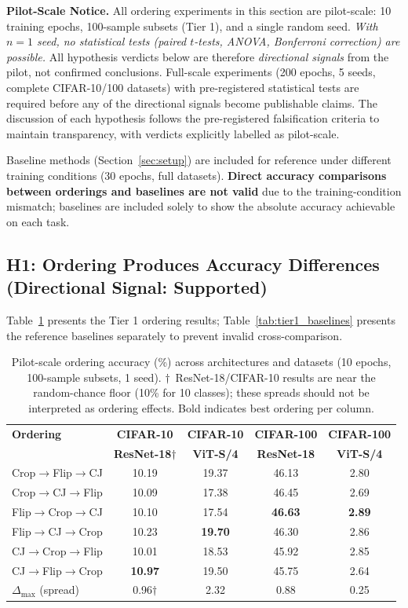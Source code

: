 \documentclass{article}
\begin{document}
\noindent\textbf{Pilot-Scale Notice.} All ordering experiments in this section are pilot-scale: 10 training epochs, 100-sample subsets (Tier 1), and a single random seed. \textit{With $n=1$ seed, no statistical tests (paired $t$-tests, ANOVA, Bonferroni correction) are possible.} All hypothesis verdicts below are therefore \emph{directional signals} from the pilot, not confirmed conclusions. Full-scale experiments (200 epochs, 5 seeds, complete CIFAR-10/100 datasets) with pre-registered statistical tests are required before any of the directional signals become publishable claims. The discussion of each hypothesis follows the pre-registered falsification criteria to maintain transparency, with verdicts explicitly labelled as pilot-scale.

Baseline methods (Section~\ref{sec:setup}) are included for reference under different training conditions (30 epochs, full datasets). \textbf{Direct accuracy comparisons between orderings and baselines are not valid} due to the training-condition mismatch; baselines are included solely to show the absolute accuracy achievable on each task.

\subsection{H1: Ordering Produces Accuracy Differences (Directional Signal: Supported)}

Table~\ref{tab:tier1_orderings} presents the Tier 1 ordering results; Table~\ref{tab:tier1_baselines} presents the reference baselines separately to prevent invalid cross-comparison.

\begin{table}[t]
\centering
\caption{Pilot-scale ordering accuracy (\%) across architectures and datasets (10 epochs, 100-sample subsets, 1 seed). $\dagger$~ResNet-18/CIFAR-10 results are near the random-chance floor (10\% for 10 classes); these spreads should not be interpreted as ordering effects. Bold indicates best ordering per column.}
\label{tab:tier1_orderings}
\small
\begin{tabular}{lcccc}
\toprule
\textbf{Ordering} & \textbf{CIFAR-10} & \textbf{CIFAR-10} & \textbf{CIFAR-100} & \textbf{CIFAR-100} \\
 & \textbf{ResNet-18}$\dagger$ & \textbf{ViT-S/4} & \textbf{ResNet-18} & \textbf{ViT-S/4} \\
\midrule
Crop$\to$Flip$\to$CJ & 10.19 & 19.37 & 46.13 & 2.80 \\
Crop$\to$CJ$\to$Flip & 10.09 & 17.38 & 46.45 & 2.69 \\
Flip$\to$Crop$\to$CJ & 10.10 & 17.54 & \textbf{46.63} & \textbf{2.89} \\
Flip$\to$CJ$\to$Crop & 10.23 & \textbf{19.70} & 46.30 & 2.86 \\
CJ$\to$Crop$\to$Flip & 10.01 & 18.53 & 45.92 & 2.85 \\
CJ$\to$Flip$\to$Crop & \textbf{10.97} & 19.50 & 45.75 & 2.64 \\
\midrule
$\Delta_{\max}$ (spread) & 0.96$\dagger$ & 2.32 & 0.88 & 0.25 \\
\bottomrule
\end{tabular}
\end{table}
\end{document}
